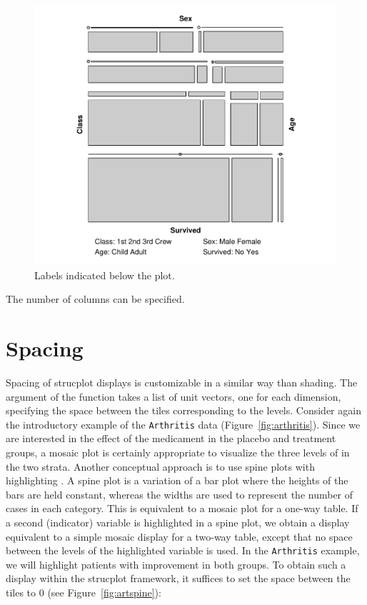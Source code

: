 \documentclass{Z}
\newcommand{\data}[1]{\texttt{#1}}
\newcommand{\class}[1]{\textsf{#1}}
\newcommand{\codefun}[1]{\code{#1()}}
\begin{document}
\begin{figure}[p]
\begin{center}
\includegraphics{strucplot-listfig}
\caption{Labels indicated below the plot.}
\label{fig:list}
\end{center}
\end{figure}

\noindent The number of columns can be specified.

\section{Spacing}
\label{sec:spacing}

Spacing of strucplot displays is customizable in a similar way than shading. The
 argument of the \codefun{strucplot} function takes a
list of \class{unit} vectors, one for each dimension, specifying the
space between the tiles corresponding to the levels. 
Consider again the introductory example of the \data{Arthritis} data 
(Figure~\ref{fig:arthritis}). Since we are interested in the effect of
the medicament in the placebo and treatment groups, a mosaic plot is
certainly appropriate to visualize the three levels of  in
the two  strata. Another conceptual approach is to use
spine plots with highlighting \citep{vcd:hummel:1996}. A spine plot is
a variation of a bar plot where the heights of the bars are held
constant, whereas the widths are used to represent the number of cases
in each category. This is equivalent to a mosaic plot for a one-way table.
If a second (indicator) variable is highlighted in a spine plot, we
obtain a display equivalent to a simple mosaic display for a two-way
table, except that no space between the levels of the highlighted
variable is used.
In the \data{Arthritis} example, we will highlight patients with  
improvement in both groups. To obtain such a display within 
the strucplot framework, it suffices to set the space between the 
tiles to 0 (see Figure~\ref{fig:artspine}):
\end{document}
